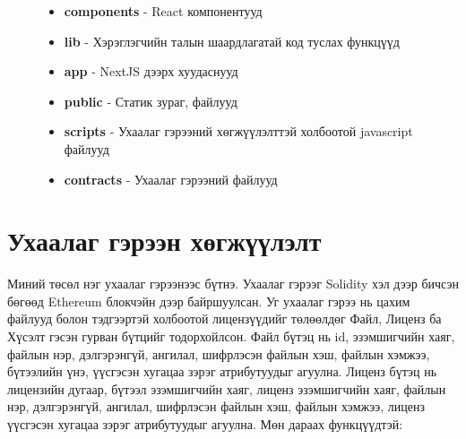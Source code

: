\begin{figure}[htbp]
\begin{minipage}[h!t]{0.5\textwidth}
      \raggedright
      \begin{itemize}
         \item \textbf{components} - React компонентууд
         \item \textbf{lib} - Хэрэглэгчийн талын шаардлагатай код туслах функцүүд
         \item \textbf{app} - NextJS дээрх хуудаснууд
         \item \textbf{public} - Статик зураг, файлууд
         \item \textbf{scripts} - Ухаалаг гэрээний хөгжүүлэлттэй холбоотой  javascript файлууд
         \item \textbf{contracts} - Ухаалаг гэрээний файлууд
      \end{itemize}
  \end{minipage}
\end{figure}

\newpage
\section{Ухаалаг гэрээн хөгжүүлэлт}
Миний төсөл нэг ухаалаг гэрээнээс бүтнэ. Ухаалаг гэрээг Solidity хэл дээр бичсэн бөгөөд Ethereum  блокчэйн дээр байршуулсан. Уг ухаалаг гэрээ нь цахим файлууд болон тэдгээртэй холбоотой лицензүүдийг төлөөлдөг Файл, Лиценз ба Хүсэлт гэсэн гурван бүтцийг тодорхойлсон. Файл бүтэц  нь id, эзэмшигчийн хаяг, файлын нэр, дэлгэрэнгүй, ангилал, шифрлэсэн файлын хэш, файлын хэмжээ, бүтээлийн үнэ, үүсгэсэн хугацаа зэрэг атрибутуудыг агуулна. Лиценз бүтэц нь лицензийн дугаар, бүтээл эзэмшигчийн хаяг, лиценз эзэмшигчийн хаяг, файлын нэр, дэлгэрэнгүй, ангилал, шифрлэсэн файлын хэш, файлын хэмжээ, лиценз үүсгэсэн хугацаа  зэрэг атрибутуудыг агуулна.
Мөн дараах функцүүдтэй:

